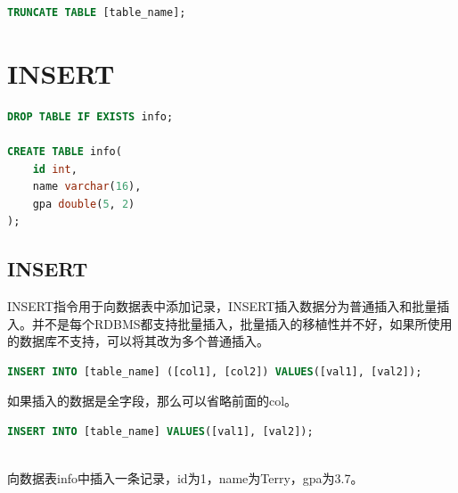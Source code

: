 \documentclass[12pt, openany, oneside]{book}
\begin{document}
\begin{lstlisting}[language=SQL]
TRUNCATE TABLE [table_name];
\end{lstlisting}

\newpage

\chapter{INSERT}

\vspace{0.5cm}


\begin{lstlisting}[language=SQL]
DROP TABLE IF EXISTS info;

CREATE TABLE info(
    id int,
    name varchar(16),
    gpa double(5, 2)
);
\end{lstlisting}

\vspace{0.5cm}

\section{INSERT}

INSERT指令用于向数据表中添加记录，INSERT插入数据分为普通插入和批量插入。并不是每个RDBMS都支持批量插入，批量插入的移植性并不好，如果所使用的数据库不支持，可以将其改为多个普通插入。

\vspace{-0.5cm}

\begin{lstlisting}[language=SQL]
INSERT INTO [table_name] ([col1], [col2]) VALUES([val1], [val2]);
\end{lstlisting}

如果插入的数据是全字段，那么可以省略前面的col。

\vspace{-0.5cm}

\begin{lstlisting}[language=SQL]
INSERT INTO [table_name] VALUES([val1], [val2]);
\end{lstlisting}

\vspace{0.5cm}

\\

向数据表info中插入一条记录，id为1，name为Terry，gpa为3.7。

\vspace{-0.5cm}
\end{document}
